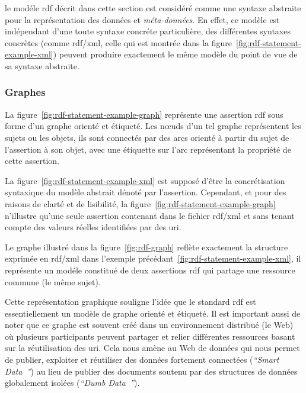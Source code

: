 le modéle \acrshort{rdf} décrit dans cette section est considéré comme
une syntaxe abstraite pour la représentation des données et
\emph{méta-données}. En effet, ce modèle est indépendant d'une toute
syntaxe concréte particulière, des différentes syntaxes concrètes
(comme \acrshort{rdf/xml}, celle qui est montrée dans la
figure~\ref{fig:rdf-statement-example-xml}) peuvent produire
exactement le même modèle du point de vue de sa syntaxe
abstraite.\medskip

\subsubsection{Graphes}
\label{sec:semantic-web-rdf-rdf-graphs}

La figure~\ref{fig:rdf-statement-example-graph} représente une
assertion \acrshort{rdf} sous forme d'un graphe orienté et
étiqueté. Les nœuds d'un tel graphe représentent les sujets ou les
objets, ils sont connectés par des arcs orienté à partir du sujet de
l'assertion à son objet, avec une étiquette sur l'arc représentant la
propriété de cette assertion.\medskip

La figure~\ref{fig:rdf-statement-example-xml} est supposé d'être la
concrétisation syntaxique du modèle abstrait dénoté par
l'assertion. Cependant, et pour des raisons de clarté et de
lisibilité, la figure~\ref{fig:rdf-statement-example-graph} n'illustre
qu'une seule assertion contenant dans le fichier \acrshort{rdf/xml} et
sans tenant compte des valeurs réelles identifiées par des
\acrshort{uri}.\medskip



Le graphe illustré dans la figure~\ref{fig:rdf-graph} reflète
exactement la structure exprimée en \acrshort{rdf/xml} dans l'exemple
précédant~\ref{fig:rdf-statement-example-xml}, il représente un modéle
constitué de deux assertions \acrshort{rdf} qui partage une ressource
commune (le même sujet).\medskip

Cette représentation graphique souligne l'idée que le standard
\acrshort{rdf} est essentiellement un modèle de graphe orienté et
étiqueté. Il est important aussi de noter que ce graphe est souvent
créé dans un environnement distribué (le Web) où plusieurs
participants peuvent partager et relier différentes ressources basant
sur la réutilisation des \acrshort{uri}. Cela nous amène au Web de
données qui nous permet de publier, exploiter et réutiliser des
données fortement connectées (\emph{``Smart
  Data~\cite{allemang2011semantic}''}) au lieu de publier des
documents soutenu par des structures de données globalement isolées
(\emph{``Dumb Data~\cite{allemang2011semantic}''}).\medskip

